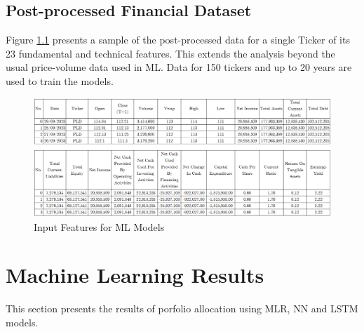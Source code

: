 \documentclass[a4paper,12pt]{report}
\numberwithin{equation}{section}
\theoremstyle{definition}
\begin{document}
\begin{landscape}
\chapter{Post-processed Financial Dataset}
Figure \ref{fig:post_processed_data} presents a sample of the post-processed data for a single Ticker of its 23 fundamental and technical features. This extends the analysis beyond the usual price-volume data used in ML. Data for 150 tickers and up to 20 years are used to train the models.
\begin{figure}[H]
  \centerline{\includegraphics[width=23cm]{post-processed data}}
  \caption{Input Features for ML Models}
  \label{fig:post_processed_data}
\end{figure}

\end{landscape}

\chapter{Machine Learning Results}
This section presents the results of porfolio allocation using MLR, NN and LSTM models. 
\end{document}
